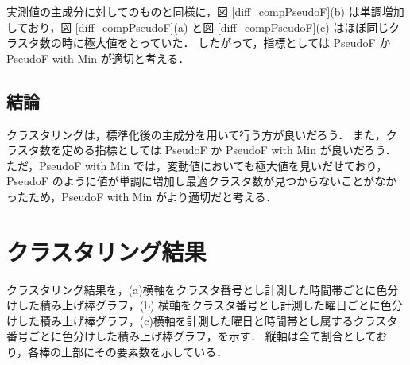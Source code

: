 \documentclass[a4j]{jarticle}
\begin{document}
実測値の主成分に対してのものと同様に，図 \ref{diff_compPseudoF}(b) は単調増加しており，図 \ref{diff_compPseudoF}(a) と図 \ref{diff_compPseudoF}(c) はほぼ同じクラスタ数の時に極大値をとっていた．
したがって，指標としては PseudoF か PseudoF with Min が適切と考える．

\subsection{結論}
クラスタリングは，標準化後の主成分を用いて行う方が良いだろう．
また，クラスタ数を定める指標としては PseudoF か PseudoF with Min が良いだろう．
ただ，PseudoF with Min では，変動値においても極大値を見いだせており，PseudoF のように値が単調に増加し最適クラスタ数が見つからないことがなかったため，PseudoF with Min がより適切だと考える．

\newpage
\section{クラスタリング結果}
クラスタリング結果を，(a)横軸をクラスタ番号とし計測した時間帯ごとに色分けした積み上げ棒グラフ，(b) 横軸をクラスタ番号とし計測した曜日ごとに色分けした積み上げ棒グラフ，(c)横軸を計測した曜日と時間帯とし属するクラスタ番号ごとに色分けした積み上げ棒グラフ，を示す．
縦軸は全て割合としており，各棒の上部にその要素数を示している．
\end{document}
